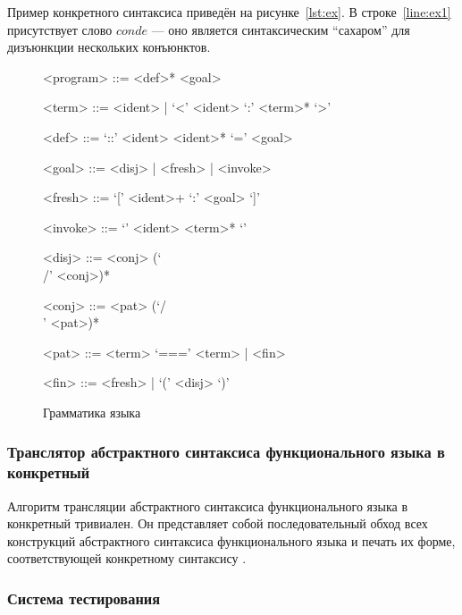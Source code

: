 Пример конкретного синтаксиса приведён на рисунке~\ref{lst:ex}.
В строке~\ref{line:ex1} присутствует слово $conde$ --- оно является синтаксическим ``сахаром'' для дизъюнкции нескольких конъюнктов.

\begin{figure}[h!]
  \begin{center}
    \begin{boxedminipage}{\linewidth}
    \begin{grammar}
    <program> ::= <def>* <goal>
    
    <term> ::= <ident> | `<' <ident> `:' <term>* `>'
    
    <def> ::= `::' <ident> <ident>* `=' <goal>
    
    <goal> ::= <disj> | <fresh> | <invoke>
    
    <fresh> ::= `[' <ident>+ `:' <goal> `]'
    
    <invoke> ::= `{' <ident> <term>* `}'
    
    <disj> ::= <conj> (`\\/' <conj>)*
    
    <conj> ::= <pat> (`/\\' <pat>)*
    
    <pat> ::= <term> `===' <term> | <fin>
    
    <fin> ::= <fresh> | `(' <disj> `)'
    \end{grammar}
    \end{boxedminipage}
  \end{center}
  \caption{Грамматика языка \miniKanren{}}
  \label{mk:grammar}
\end{figure}


\subsubsection{Транслятор абстрактного синтаксиса функционального языка в конкретный}

Алгоритм трансляции абстрактного синтаксиса функционального языка в конкретный тривиален.
Он представляет собой последовательный обход всех конструкций абстрактного синтаксиса функционального языка и печать их форме, соответствующей конкретному синтаксису \haskell{}.


\subsubsection{Система тестирования}

